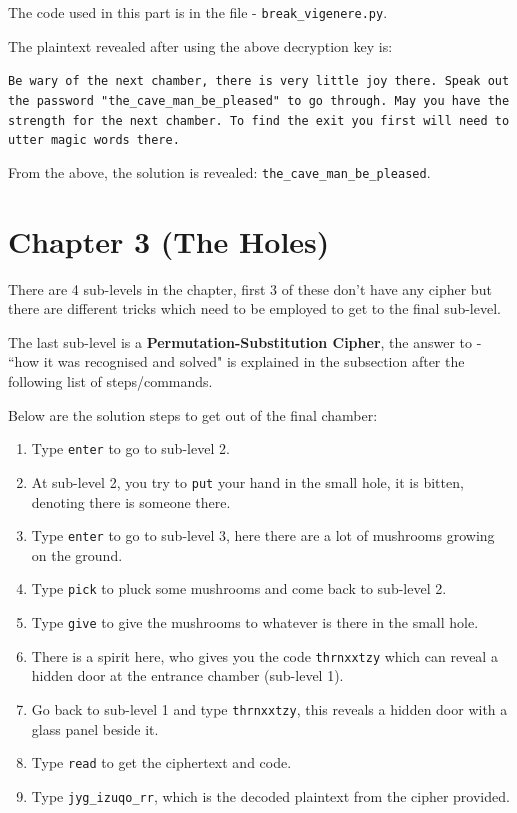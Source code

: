 \documentclass[10pt,twoside]{article}
\begin{document}
The code used in this part is in the file - \texttt{break\_vigenere.py}. \newline

The plaintext revealed after using the above decryption key is: \newline

\texttt{Be wary of the next chamber, there is very little joy there. Speak out the password \newline"the\_cave\_man\_be\_pleased" to go through. May you have the strength for the next chamber. To find the exit you first will need to utter magic words there.} \newline

From the above, the solution is revealed: \texttt{the\_cave\_man\_be\_pleased}.

\newpage
\section{Chapter 3 (The Holes)}
There are 4 sub-levels in the chapter, first 3 of these don't have any cipher but there are different tricks which need to be employed to get to the final sub-level. \newline

The last sub-level is a \textbf{Permutation-Substitution Cipher}, the answer to - ``how it was recognised and solved" is explained in the subsection after the following list of steps/commands. \newline

Below are the solution steps to get out of the final chamber:
\begin{enumerate}
  \setlength\itemsep{0em}
  \item Type \texttt{enter} to go to sub-level 2.
  \item At sub-level 2, you try to \texttt{put} your hand in the small hole, it is bitten, denoting there is someone there.
  \item Type \texttt{enter} to go to sub-level 3, here there are a lot of mushrooms growing on the ground.
  \item Type \texttt{pick} to pluck some mushrooms and come back to sub-level 2.
  \item Type \texttt{give} to give the mushrooms to whatever is there in the small hole.
  \item There is a spirit here, who gives you the code \texttt{thrnxxtzy} which can reveal a hidden door at the entrance chamber (sub-level 1).
  \item Go back to sub-level 1 and type \texttt{thrnxxtzy}, this reveals a hidden door with a glass panel beside it.
  \item Type \texttt{read} to get the ciphertext and code.
  \item Type \texttt{jyg\_izuqo\_rr}, which is the decoded plaintext from the cipher provided.
\end{enumerate}
\end{document}
